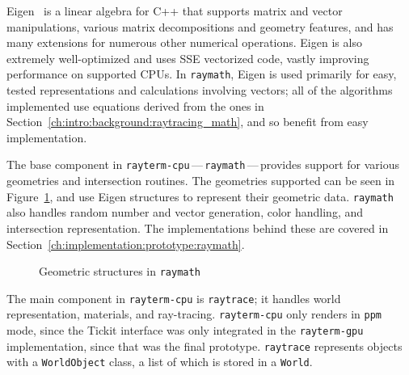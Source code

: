 Eigen~\cite{eigenweb} is a linear algebra for C++ that supports matrix and vector manipulations, various matrix decompositions and geometry features, and has many extensions for numerous other numerical operations.
Eigen is also extremely well-optimized and uses SSE vectorized code, vastly improving performance on supported CPUs.
In \texttt{raymath}, Eigen is used primarily for easy, tested representations and calculations involving vectors; all of the algorithms implemented use equations derived from the ones in Section~\ref{ch:intro:background:raytracing_math}, and so benefit from easy implementation.

The base component in \texttt{rayterm-cpu}\,---\,\texttt{raymath}\,---\,provides support for various geometries and intersection routines.
The geometries supported can be seen in Figure~\ref{fig:rayterm-cpu_raymath_geometry}, and use Eigen structures to represent their geometric data.
\texttt{raymath} also handles random number and vector generation, color handling, and intersection representation.
The implementations behind these are covered in Section~\ref{ch:implementation:prototype:raymath}.

\vspace{0.3em}
\begin{figure}[htb]
  \centering
  \caption{Geometric structures in \texttt{raymath}}
\label{fig:rayterm-cpu_raymath_geometry}
\end{figure}

The main component in \texttt{rayterm-cpu} is \texttt{raytrace}; it handles world representation, materials, and ray-tracing.
\texttt{rayterm-cpu} only renders in \texttt{ppm} mode, since the Tickit interface was only integrated in the \texttt{rayterm-gpu} implementation, since that was the final prototype.
\texttt{raytrace} represents objects with a \texttt{WorldObject} class, a list of which is stored in a \texttt{World}.

